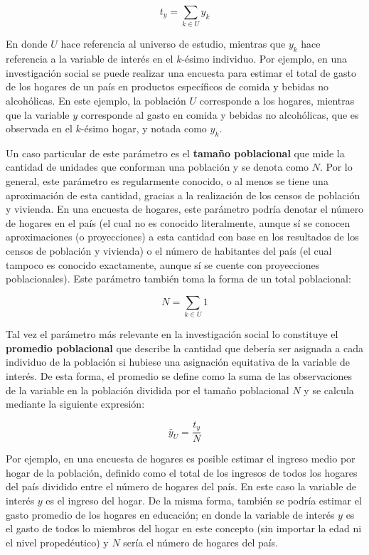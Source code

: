 \documentclass[
  12pt,
]{book}
\begin{document}
\[t_y = \sum_{k \in U} y_k\]

En donde \(U\) hace referencia al universo de estudio, mientras que \(y_k\) hace referencia a la variable de interés en el \(k\)-ésimo individuo. Por ejemplo, en una investigación social se puede realizar una encuesta para estimar el total de gasto de los hogares de un país en productos específicos de comida y bebidas no alcohólicas. En este ejemplo, la población \(U\) corresponde a los hogares, mientras que la variable \(y\) corresponde al gasto en comida y bebidas no alcohólicas, que es observada en el \(k\)-ésimo hogar, y notada como \(y_k\).

Un caso particular de este parámetro es el \textbf{tamaño poblacional} que mide la cantidad de unidades que conforman una población y se denota como \(N\). Por lo general, este parámetro es regularmente conocido, o al menos se tiene una aproximación de esta cantidad, gracias a la realización de los censos de población y vivienda. En una encuesta de hogares, este parámetro podría denotar el número de hogares en el país (el cual no es conocido literalmente, aunque sí se conocen aproximaciones (o proyecciones) a esta cantidad con base en los resultados de los censos de población y vivienda) o el número de habitantes del país (el cual tampoco es conocido exactamente, aunque sí se cuente con proyecciones poblacionales). Este parámetro también toma la forma de un total poblacional:

\[N = \sum_{k \in U}1\]

Tal vez el parámetro más relevante en la investigación social lo constituye el \textbf{promedio poblacional} que describe la cantidad que debería ser asignada a cada individuo de la población si hubiese una asignación equitativa de la variable de interés. De esta forma, el promedio se define como la suma de las observaciones de la variable en la población dividida por el tamaño poblacional \(N\) y se calcula mediante la siguiente expresión:

\[\bar{y}_U = \frac{t_y}{N}\]

Por ejemplo, en una encuesta de hogares es posible estimar el ingreso medio por hogar de la población, definido como el total de los ingresos de todos los hogares del país dividido entre el número de hogares del país. En este caso la variable de interés \(y\) es el ingreso del hogar. De la misma forma, también se podría estimar el gasto promedio de los hogares en educación; en donde la variable de interés \(y\) es el gasto de todos lo miembros del hogar en este concepto (sin importar la edad ni el nivel propedéutico) y \(N\) sería el número de hogares del país.
\end{document}
